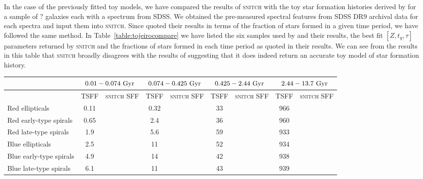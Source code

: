 \documentclass[useAMS,usenatbib]{mn2e}
\begin{document}
In the case of the previously fitted toy models, we have compared the results of \textsc{snitch} with the toy star formation histories derived by \cite{tojeiro13} for a sample of $?$ galaxies each with a spectrum from SDSS. We obtained the pre-measured spectral features from SDSS DR9 \cite{abazajian09} archival data for each spectra and input them into \textsc{snitch}. Since \cite{tojeiro13} quoted their results in terms of the fraction of stars formed in a given time period, we have followed the same method. In Table~\ref{table:tojeirocompare} we have listed the six samples used by \citeauthor{tojeiro13} and their results, the best fit $[Z, t_q, \tau]$ parameters returned by \textsc{snitch} and the  fractions of stars formed in each time period as quoted in their results. We can see from the results in this table that \textsc{snitch} broadly {dis}agrees with the results of \cite{tojeiro13} suggesting that it does indeed return an accurate toy model of star formation history. 

\begin{table*}
\centering
\caption{The mean star formation fraction (SFF) in each age bin for the six galaxy samples quoted by \protect\cite[][TSFF]{tojeiro13} and returned by \textsc{snitch}. Each value is quoted with a $1\sigma$ uncertainty, for the \protect\cite{tojeiro13} values this is quoted as the standard error on the mean for each bin . The SFF and $1\sigma$ errors are given in units of $10^{-3}$.}
\label{table:tojeirocompare}
\begin{tabular*}{0.9\textwidth}{l|cc|cc|cc|cc}
                        & \multicolumn{2}{c|}{$0.01 - 0.074~\rm{Gyr}$}     & \multicolumn{2}{c|}{$0.074 - 0.425~\rm{Gyr}$} & \multicolumn{2}{c|}{$0.425 - 2.44~\rm{Gyr}$} & \multicolumn{2}{c}{$2.44 - 13.7~\rm{Gyr}$} \\ \hline
                        & TSFF & \multicolumn{1}{c|}{\textsc{snitch} SFF} & TSFF          & \textsc{snitch} SFF          & TSFF          & \textsc{snitch} SFF         & TSFF         & \textsc{snitch} SFF        \\ \hline
Red ellipticals         & 0.11   &    &  0.32  &       &  33   &      &  966  &       \\
Red early-type spirals  & 0.65   &    &  2.4   &       &  36   &      &  960  &       \\
Red late-type spirals   &  1.9   &    &  5.6   &       &  59   &      &  933  &       \\ \hline
Blue ellipticals        &  2.5   &    &  11    &       &  52   &      &  934  &       \\
Blue early-type spirals &  4.9   &    &  14    &       &  42   &      &  938  &       \\
Blue late-type spirals  &  6.1   &    &  11    &       &  43   &      &  939  &                             
\end{tabular*}
\end{table*}
\end{document}
